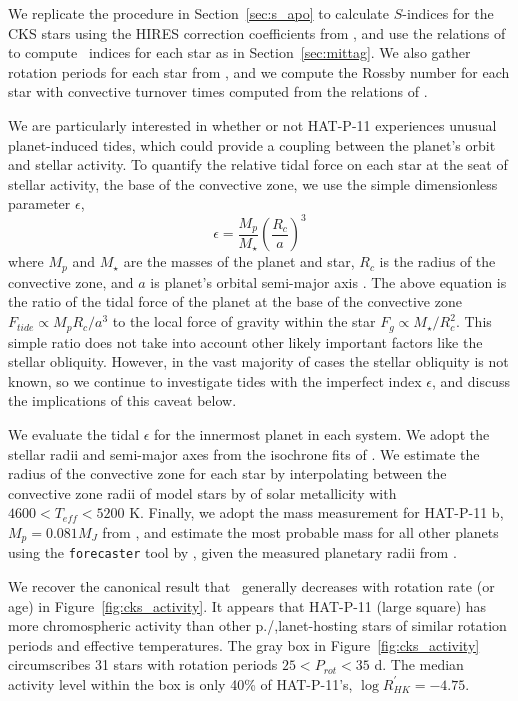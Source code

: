 We replicate the procedure in Section~\ref{sec:s_apo} to calculate $S$-indices for the CKS stars using the HIRES correction coefficients from \citet{Isaacson2010}, and use the relations of \citet{Mittag2013} to compute \rprime\ indices for each star as in Section~\ref{sec:mittag}. We also gather rotation periods for each star from \citet{Mazeh2015}, and we compute the Rossby number for each star with convective turnover times computed from the relations of \citet{Wright2011}.

We are particularly interested in whether or not HAT-P-11 experiences unusual planet-induced tides, which could provide a coupling between the planet's orbit and stellar activity. To quantify the relative tidal force on each star at the seat of stellar activity, the base of the convective zone, we use the simple dimensionless parameter $\epsilon$, 
\begin{equation}
\epsilon = \frac{M_p}{M_\star} \left( \frac{R_c}{a}\right)^3
\end{equation}
where $M_p$ and $M_\star$ are the masses of the planet and star, $R_c$ is the radius of the convective zone, and $a$ is planet's orbital semi-major axis \citep{Ogilvie2014}. The above equation is the ratio of the tidal force of the planet at the base of the convective zone $F_{tide} \propto M_p R_c / a^3$ to the local force of gravity within the star $F_g \propto M_\star / R_c^2$. This simple ratio does not take into account other likely important factors like the stellar obliquity. However, in the vast majority of cases the stellar obliquity is not known, so we continue to investigate tides with the imperfect index $\epsilon$, and discuss the implications of this caveat below.

We evaluate the tidal $\epsilon$ for the innermost planet in each system. We adopt the stellar radii and semi-major axes from the isochrone fits of \citet{Johnson2017}. We estimate the radius of the convective zone for each star by interpolating between the convective zone radii of model stars by \citet{vanSaders2012} of solar metallicity with $4600<T_{eff}<5200$ K. Finally, we adopt the mass measurement for HAT-P-11 b, $M_p=0.081 M_J$ from \citet{bakos2010}, and estimate the most probable mass for all other planets using the \texttt{forecaster} tool by \citet{Chen2017}, given the measured planetary radii from \citet{Johnson2017}.

We recover the canonical result that \rprime\ generally decreases with rotation rate (or age) in Figure~\ref{fig:cks_activity}. It appears that HAT-P-11 (large square) has more chromospheric activity than other p./,lanet-hosting stars of similar rotation periods and effective temperatures. The gray box in Figure~\ref{fig:cks_activity} circumscribes 31 stars with rotation periods $25 < P_{rot} < 35$ d. The median activity level within the box is only 40\% of HAT-P-11's, $\log R^\prime_{HK} = -4.75$.

